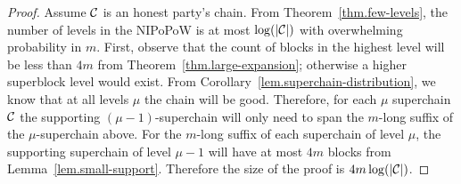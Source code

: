 \begin{proof}
    Assume $\mathcal{C}$ is an honest party's chain. From
    Theorem~\ref{thm.few-levels}, the number of levels in the NIPoPoW is at most
    $\log(|\mathcal{C}|)$ with overwhelming probability in $m$. First, observe that
    the count of blocks in the highest level will be less than $4m$ from
    Theorem~\ref{thm.large-expansion}; otherwise a higher superblock level would
    exist. From Corollary~\ref{lem.superchain-distribution}, we know that at all
    levels $\mu$ the chain will be good. Therefore, for each $\mu$ superchain
    $\mathcal{C}$ the supporting $(\mu - 1)$-superchain will only need to span the
    $m$-long suffix of the $\mu$-superchain above. For the $m$-long suffix of
    each superchain of level $\mu$, the supporting superchain of level $\mu - 1$
    will have at most $4m$ blocks from Lemma~\ref{lem.small-support}. Therefore
    the size of the proof is $4m \log(|\mathcal{C}|)$.
    \Qed
\end{proof}
